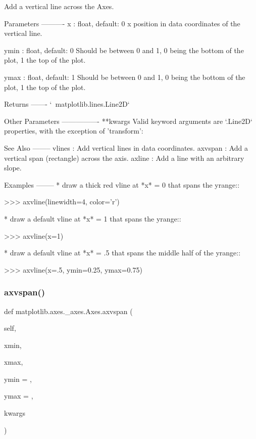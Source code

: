 \begin{DoxyVerb}Add a vertical line across the Axes.

Parameters
----------
x : float, default: 0
    x position in data coordinates of the vertical line.

ymin : float, default: 0
    Should be between 0 and 1, 0 being the bottom of the plot, 1 the
    top of the plot.

ymax : float, default: 1
    Should be between 0 and 1, 0 being the bottom of the plot, 1 the
    top of the plot.

Returns
-------
`~matplotlib.lines.Line2D`

Other Parameters
----------------
**kwargs
    Valid keyword arguments are `.Line2D` properties, with the
    exception of 'transform':


See Also
--------
vlines : Add vertical lines in data coordinates.
axvspan : Add a vertical span (rectangle) across the axis.
axline : Add a line with an arbitrary slope.

Examples
--------
* draw a thick red vline at *x* = 0 that spans the yrange::

    >>> axvline(linewidth=4, color='r')

* draw a default vline at *x* = 1 that spans the yrange::

    >>> axvline(x=1)

* draw a default vline at *x* = .5 that spans the middle half of
  the yrange::

    >>> axvline(x=.5, ymin=0.25, ymax=0.75)
\end{DoxyVerb}
 \mbox{\label{classmatplotlib_1_1axes_1_1__axes_1_1Axes_a409bdfce4dd1a3c579f01263ec4c2d97}} 
\subsubsection{\texorpdfstring{axvspan()}{axvspan()}}
{\footnotesize\ttfamily def matplotlib.\+axes.\+\_\+axes.\+Axes.\+axvspan (\begin{DoxyParamCaption}\item[{}]{self,  }\item[{}]{xmin,  }\item[{}]{xmax,  }\item[{}]{ymin = {},  }\item[{}]{ymax = {},  }\item[{}]{kwargs }\end{DoxyParamCaption})}


